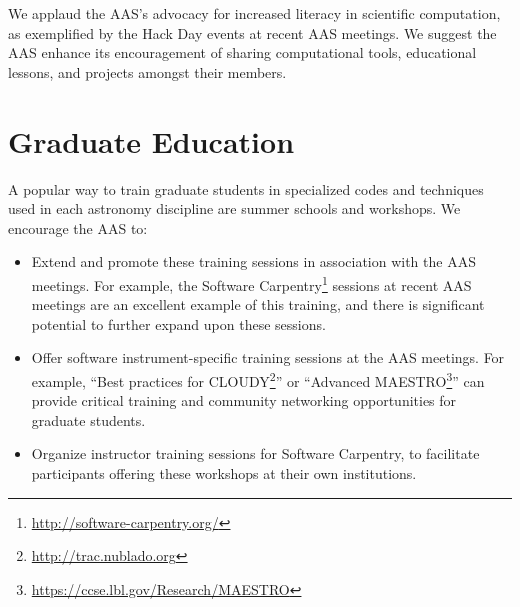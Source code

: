 \documentclass[11pt]{article}
\newenvironment{squishlist}                                                     
  {\begin{itemize}                                                              
    \addtolength{\itemsep}{-0.33\baselineskip}                                  
   }                                                                            
  { \end{itemize} }
\begin{document}
We applaud the AAS's advocacy for increased literacy in scientific computation,
 as exemplified by the Hack Day events at recent AAS meetings.  We
suggest the AAS enhance its encouragement of sharing computational
tools, educational lessons, and projects amongst their members.


%





\section{Graduate Education}

A popular way to train graduate students in specialized codes and
techniques used in each astronomy discipline are summer schools
and workshops. We encourage the AAS to:

\begin{squishlist}

\item Extend and promote these training sessions
in association with the AAS meetings.  
For example, the Software Carpentry\footnote{\url{http://software-carpentry.org/}} 
sessions at recent AAS meetings are an excellent example of this training, 
and there is significant potential to further expand upon these sessions.  

\item Offer software instrument-specific training sessions
at the AAS meetings. For example, ``Best practices for CLOUDY\footnote{\url{http://trac.nublado.org}}''
or ``Advanced MAESTRO\footnote{\url{ https://ccse.lbl.gov/Research/MAESTRO}}'' can
provide critical training and community networking opportunities for graduate students.

\item Organize instructor training sessions for Software Carpentry,
to facilitate participants offering these workshops at their own institutions.

\end{squishlist}
\end{document}
